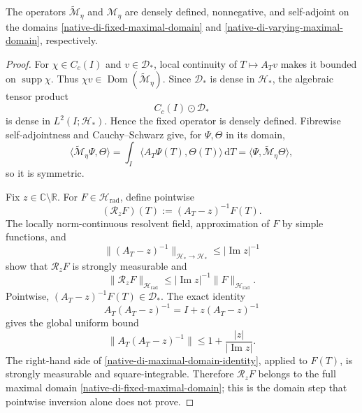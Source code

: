 \begin{proposition}
\label{native-di-self-adjoint-proposition}
The operators \(\widetilde{\mathscr M}_\eta\) and
\(\mathscr M_\eta\) are densely defined, nonnegative, and self-adjoint on
the domains \eqref{native-di-fixed-maximal-domain} and
\eqref{native-di-varying-maximal-domain}, respectively.
\end{proposition}

\begin{proof}
For \(\chi\in C_c(I)\) and \(v\in\mathscr D_*\), local continuity of
\(T\mapsto A_Tv\) makes it bounded on \(\operatorname{supp}\chi\).
Thus \(\chi v\in\operatorname{Dom}(\widetilde{\mathscr M}_\eta)\).  Since
\(\mathscr D_*\) is dense in \(\mathscr H_*\), the algebraic tensor product
\[
 C_c(I)\mathbin{\odot}\mathscr D_*
\]
is dense in \(L^2(I;\mathscr H_*)\).  Hence the fixed operator is densely
defined.  Fibrewise self-adjointness and Cauchy--Schwarz give, for
\(\Psi,\Theta\) in its domain,
\[
 \langle\widetilde{\mathscr M}_\eta\Psi,\Theta\rangle
 =\int_I\langle A_T\Psi(T),\Theta(T)\rangle\,\mathrm d T
 =\langle\Psi,\widetilde{\mathscr M}_\eta\Theta\rangle,
\]
so it is symmetric.

Fix \(z\in\mathbb C\setminus\mathbb R\).  For
\(F\in\mathscr H_{\mathrm{rad}}\), define pointwise
\begin{equation}
 (\mathcal R_zF)(T):=(A_T-z)^{-1}F(T).
\label{native-di-radial-resolvent}
\end{equation}
The locally norm-continuous resolvent field, approximation of \(F\) by
simple functions, and
\[
 \|(A_T-z)^{-1}\|_{\mathscr H_*\to\mathscr H_*}
 \le|\operatorname{Im}z|^{-1}
\]
show that \(\mathcal R_zF\) is strongly measurable and
\begin{equation}
 \|\mathcal R_zF\|_{\mathscr H_{\mathrm{rad}}}
 \le|\operatorname{Im}z|^{-1}
    \|F\|_{\mathscr H_{\mathrm{rad}}}.
\label{native-di-radial-resolvent-L2}
\end{equation}
Pointwise, \((A_T-z)^{-1}F(T)\in\mathscr D_*\).  The exact identity
\begin{equation}
 A_T(A_T-z)^{-1}=I+z(A_T-z)^{-1}
\label{native-di-maximal-domain-identity}
\end{equation}
gives the global uniform bound
\[
 \|A_T(A_T-z)^{-1}\|
 \le1+\frac{|z|}{|\operatorname{Im}z|}.
\]
The right-hand side of \eqref{native-di-maximal-domain-identity}, applied
to \(F(T)\), is strongly measurable and square-integrable.  Therefore
\(\mathcal R_zF\) belongs to the full maximal domain
\eqref{native-di-fixed-maximal-domain}; this is the domain step that
pointwise inversion alone does not prove.


\end{proof}
